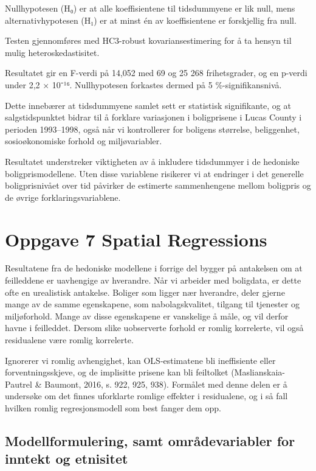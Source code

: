 \documentclass[
  norsk,
  a4paper,
]{article}
\begin{document}
Nullhypotesen (H₀) er at alle koeffisientene til tidsdummyene er lik
null, mens alternativhypotesen (H₁) er at minst én av koeffisientene er
forskjellig fra null.

Testen gjennomføres med HC3-robust kovariansestimering for å ta hensyn
til mulig heteroskedastisitet.

Resultatet gir en F-verdi på 14,052 med 69 og 25 268 frihetsgrader, og
en p-verdi under 2,2 × 10⁻¹⁶. Nullhypotesen forkastes dermed på 5
\%-signifikansnivå.

Dette innebærer at tidsdummyene samlet sett er statistisk signifikante,
og at salgstidspunktet bidrar til å forklare variasjonen i boligprisene
i Lucas County i perioden 1993--1998, også når vi kontrollerer for
boligens størrelse, beliggenhet, sosioøkonomiske forhold og
miljøvariabler.

Resultatet understreker viktigheten av å inkludere tidsdummyer i de
hedoniske boligprismodellene. Uten disse variablene risikerer vi at
endringer i det generelle boligprisnivået over tid påvirker de estimerte
sammenhengene mellom boligpris og de øvrige forklaringsvariablene.

\section{Oppgave 7 Spatial
Regressions}\label{oppgave-7-spatial-regressions}

Resultatene fra de hedoniske modellene i forrige del bygger på
antakelsen om at feilleddene er uavhengige av hverandre. Når vi arbeider
med boligdata, er dette ofte en urealistisk antakelse. Boliger som
ligger nær hverandre, deler gjerne mange av de samme egenskapene, som
nabolagskvalitet, tilgang til tjenester og miljøforhold. Mange av disse
egenskapene er vanskelige å måle, og vil derfor havne i feilleddet.
Dersom slike uobserverte forhold er romlig korrelerte, vil også
residualene være romlig korrelerte.

Ignorerer vi romlig avhengighet, kan OLS-estimatene bli ineffisiente
eller forventningsskjeve, og de implisitte prisene kan bli feiltolket
(Maslianskaia-Pautrel \& Baumont, 2016, s. 922, 925, 938). Formålet med
denne delen er å undersøke om det finnes uforklarte romlige effekter i
residualene, og i så fall hvilken romlig regresjonsmodell som best
fanger dem opp.

\subsection{Modellformulering, samt områdevariabler for inntekt og
etnisitet}\label{modellformulering-samt-omruxe5devariabler-for-inntekt-og-etnisitet}
\end{document}
